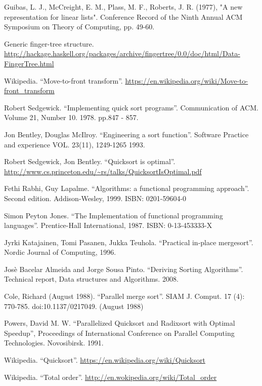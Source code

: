 \begin{thebibliography}{99}
Guibas, L. J., McCreight, E. M., Plass, M. F., Roberts, J. R. (1977), "A new representation for linear lists". Conference Record of the Ninth Annual ACM Symposium on Theory of Computing, pp. 49-60.

Generic finger-tree structure. \url{http://hackage.haskell.org/packages/archive/fingertree/0.0/doc/html/Data-FingerTree.html}

Wikipedia. ``Move-to-front transform''. \url{https://en.wikipedia.org/wiki/Move-to-front_transform}


Robert Sedgewick. ``Implementing quick sort programs''. Communication of ACM. Volume 21, Number 10. 1978. pp.847 - 857.

Jon Bentley, Douglas McIlroy. ``Engineering a sort function''. Software Practice and experience VOL. 23(11), 1249-1265 1993.

Robert Sedgewick, Jon Bentley. ``Quicksort is optimal''. \url{http://www.cs.princeton.edu/~rs/talks/QuicksortIsOptimal.pdf}

Fethi Rabhi, Guy Lapalme. ``Algorithms: a functional programming approach''. Second edition. Addison-Wesley, 1999. ISBN: 0201-59604-0

Simon Peyton Jones. ``The Implementation of functional programming languages''. Prentice-Hall International, 1987. ISBN: 0-13-453333-X

Jyrki Katajainen, Tomi Pasanen, Jukka Teuhola. ``Practical in-place mergesort''. Nordic Journal of Computing, 1996.

Jos\`{e} Bacelar Almeida and Jorge Sousa Pinto. ``Deriving Sorting Algorithms''. Technical report, Data structures and Algorithms. 2008.

Cole, Richard (August 1988). ``Parallel merge sort''. SIAM J. Comput. 17 (4): 770-785. doi:10.1137/0217049. (August 1988)

Powers, David M. W. ``Parallelized Quicksort and Radixsort with Optimal Speedup'', Proceedings of International Conference on Parallel Computing Technologies. Novosibirsk. 1991.

Wikipedia. ``Quicksort''. \url{https://en.wikipedia.org/wiki/Quicksort}

Wikipedia. ``Total order''. \url{http://en.wokipedia.org/wiki/Total_order}


\end{thebibliography}
